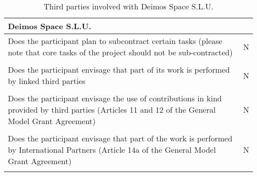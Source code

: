 \begin{table}[H]
	\centering
	\begin{tabular}{|p{10cm}|p{4cm}|}
		\hline
		
		\multicolumn{2}{|p{14cm}|}{\textbf{Deimos Space S.L.U.}}\\
		
		\hline
		
		Does the participant plan to subcontract certain tasks (please note that core tasks of the project should not be sub-contracted) & N\\
		
		\hline
		
		\multicolumn{2}{|p{14cm}|}{}\\
		
		\hline
		
		Does the participant envisage that part of its work is performed by linked third parties & N\\
		
		\hline
		
		\multicolumn{2}{|p{14cm}|}{}\\
		
		\hline
		
		Does the participant envisage the use of contributions in kind provided by third parties (Articles 11 and 12 of the General Model Grant Agreement) & N\\
		
		\hline
		
		\multicolumn{2}{|p{14cm}|}{}\\
		
		\hline
		
		Does the participant envisage that part of the work is performed by International Partners (Article 14a of the General Model Grant Agreement) & N\\
		
		\hline
		
		\multicolumn{2}{|p{14cm}|}{}\\
		
		\hline
	\end{tabular}
	\caption{Third parties involved with Deimos Space S.L.U.}
\end{table}



